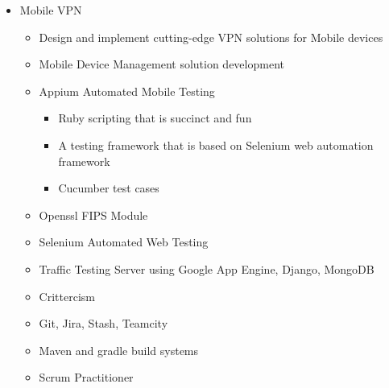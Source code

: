 \documentclass[11pt,a4paper,sans]{moderncv}        %
\begin{document}
\begin{itemize}%
\item Mobile VPN
  \begin{itemize}%
  \item Design and implement cutting-edge VPN solutions for Mobile devices
  \item Mobile Device Management solution development
  \item Appium Automated Mobile Testing
    \begin{itemize}%
    \item Ruby scripting that is succinct and fun
    \item A testing framework that is based on Selenium web automation framework
    \item Cucumber test cases
    \end{itemize}
  \item Openssl FIPS Module
  \item Selenium Automated Web Testing
  \item Traffic Testing Server using Google App Engine, Django, MongoDB
  \item Crittercism
  \item Git, Jira, Stash, Teamcity
  \item Maven and gradle build systems
  \item Scrum Practitioner
  \end{itemize}
\end{itemize}
\end{document}
